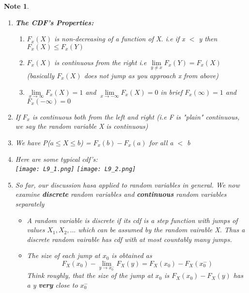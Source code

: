 \documentclass[11pt]{article}
\newtheorem*{note}{Note}
\newcommand\tab[1][1cm]{\hspace*{#1}}
\begin{document}
            \begin{note} \tab
                \begin{enumerate}
                    \item \textbf{The CDF's Properties:} 
                            \begin{enumerate}
                                \item $F_x(X)$ is non-decreasing of a function of X. i.e if x $<$ y then $F_x(X) \leq F_x(Y)$ 
                                \item $F_x(X)$ is continuous from the right i.e $\lim\limits_{y \neq x} F_x(Y) = F_x(X)$ (basically $F_x(X)$ does not jump as you approach x from above)
                                \item $\lim\limits_{x \rightarrow \infty} F_x(X) = 1$ and $\lim\limits_{x \rightarrow -\infty} F_x(X) = 0$ in brief $F_x(\infty) = 1$ and $F_x(-\infty) = 0$ 
                            \end{enumerate}
                    \item If $F_x$ is continuous both from the left and right (i.e F is "plain" continuous, we say the random variable X is continuous)
                    \item We have P($a \leq X \leq b$) = $F_x(b) - F_x(a)$ for all a $<$ b
                    \item Here are some typical cdf's:\\ \texttt{[image: L9\_1.png]} \texttt{[image: L9\_2.png]} 
                    \item  So far, our discussion hasa applied to random variables in general. 
                            We now examine \textbf{discrete} random variables and \textbf{continuous} random variables separately
                                \begin{itemize}
                                    \item A random variable is discrete if its cdf is a step function with jumps of values $X_1, X_2,...$ which can be assumed by the random vairable X. 
                                            Thus a discrete random vairable has cdf with at most countably many jumps.
                                    \item The size of each jump at $x_0$ is obtained as $$F_X(x_0) - \lim_{y\rightarrow x_0^-} F_X(y) = F_X(x_0) - F_X(x_0^-)$$
                                            Think roughly, that the size of the jump at $x_0$ is $ F_X(x_0) - F_X(y)$ has a y \textbf{very} close to $x_0^-$

\end{itemize}
\end{enumerate}
\end{note}
\end{document}
